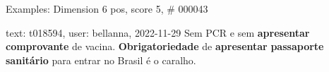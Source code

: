\begin{frame}{Examples: Dimension 6 pos, score 5, \# 000043}
\footnotesize
\begin{exampleblock}{text: t018594, user: bellanna, 2022-11-29}
Sem PCR e sem \textbf{apresentar} \textbf{comprovante} de vacina. 
\textbf{Obrigatoriedade} de \textbf{apresentar} \textbf{passaporte} 
\textbf{sanitário} para entrar no Brasil é o caralho. 
\end{exampleblock}
\end{frame}
